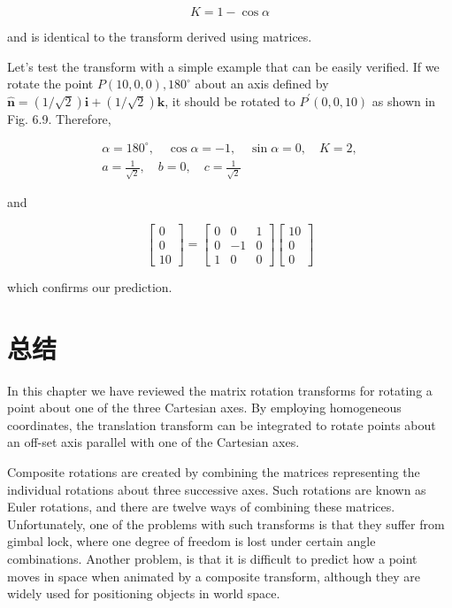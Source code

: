 $$
K=1-\cos \alpha
$$

and is identical to the transform derived using matrices.

Let's test the transform with a simple example that can be easily verified. If we rotate the point $P(10,0,0), 180^{\circ}$ about an axis defined by $\hat{\mathbf{n}}=(1 / \sqrt{2}) \mathbf{i}+(1 / \sqrt{2}) \mathbf{k}$, it should be rotated to $P^{\prime}(0,0,10)$ as shown in Fig. 6.9. Therefore,

$$
\begin{gathered}
\alpha=180^{\circ}, \quad \cos \alpha=-1, \quad \sin \alpha=0, \quad K=2, \\
a=\frac{1}{\sqrt{2}}, \quad b=0, \quad c=\frac{1}{\sqrt{2}}
\end{gathered}
$$

and

$$
\left[\begin{array}{c}
0 \\
0 \\
10
\end{array}\right]=\left[\begin{array}{ccc}
0 & 0 & 1 \\
0 & -1 & 0 \\
1 & 0 & 0
\end{array}\right]\left[\begin{array}{c}
10 \\
0 \\
0
\end{array}\right]
$$

which confirms our prediction.

\section{总结}
In this chapter we have reviewed the matrix rotation transforms for rotating a point about one of the three Cartesian axes. By employing homogeneous coordinates, the translation transform can be integrated to rotate points about an off-set axis parallel with one of the Cartesian axes.

Composite rotations are created by combining the matrices representing the individual rotations about three successive axes. Such rotations are known as Euler rotations, and there are twelve ways of combining these matrices. Unfortunately, one of the problems with such transforms is that they suffer from gimbal lock, where one degree of freedom is lost under certain angle combinations. Another problem, is that it is difficult to predict how a point moves in space when animated by a composite transform, although they are widely used for positioning objects in world space.

